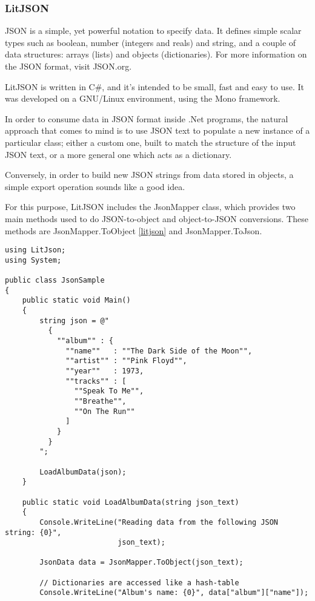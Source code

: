 {\subsubsection{LitJSON}
JSON is a simple, yet powerful notation to specify data. It defines simple scalar types such as boolean, number (integers and reals) and string, and a couple of data structures: arrays (lists) and objects (dictionaries). For more information on the JSON format, visit JSON.org.

LitJSON is written in C\#, and it’s intended to be small, fast and easy to use. It was developed on a GNU/Linux environment, using the Mono framework.

In order to consume data in JSON format inside .Net programs, the natural approach that comes to mind is to use JSON text to populate a new instance of a particular class; either a custom one, built to match the structure of the input JSON text, or a more general one which acts as a dictionary.

Conversely, in order to build new JSON strings from data stored in objects, a simple export operation sounds like a good idea.

For this purpose, LitJSON includes the JsonMapper class, which provides two main methods used to do JSON-to-object   and object-to-JSON conversions. These methods are JsonMapper.ToObject  \autoref{litjson} and JsonMapper.ToJson.
\begin{lstlisting}[caption={LitJson usage example in C\# \cite{lit}.},label={litjson}]
using LitJson;
using System;

public class JsonSample
{
    public static void Main()
    {
        string json = @"
          {
            ""album"" : {
              ""name""   : ""The Dark Side of the Moon"",
              ""artist"" : ""Pink Floyd"",
              ""year""   : 1973,
              ""tracks"" : [
                ""Speak To Me"",
                ""Breathe"",
                ""On The Run""
              ]
            }
          }
        ";

        LoadAlbumData(json);
    }

    public static void LoadAlbumData(string json_text)
    {
        Console.WriteLine("Reading data from the following JSON string: {0}",
                          json_text);

        JsonData data = JsonMapper.ToObject(json_text);

        // Dictionaries are accessed like a hash-table
        Console.WriteLine("Album's name: {0}", data["album"]["name"]);


\end{lstlisting}}
